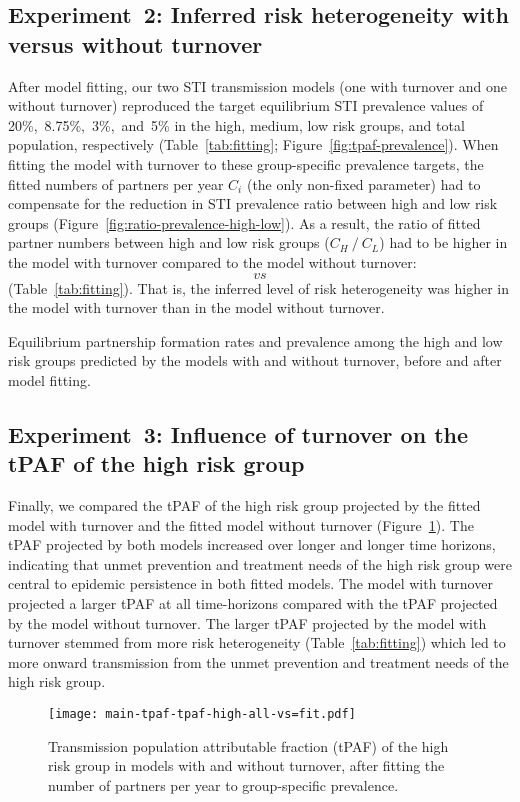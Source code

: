 \subsection{Experiment~2: Inferred risk heterogeneity with versus without turnover}
\label{ss:res-infer}
After model fitting,
our two STI transmission models
(one with turnover and one without turnover)
reproduced the target equilibrium STI prevalence values of 20\%,~8.75\%,~3\%,~and~5\%
in the high, medium, low risk groups, and total population, respectively
(Table~\ref{tab:fitting}; Figure~\ref{fig:tpaf-prevalence}).
When fitting the model with turnover to these group-specific prevalence targets,
the fitted numbers of partners per year $C_i$ (the only non-fixed parameter)
had to compensate for the reduction in
STI prevalence ratio between high and low risk groups
(Figure~\ref{fig:ratio-prevalence-high-low}).
As a result, the ratio of fitted partner numbers
between high and low risk groups ($C_H~/~C_L$)
had to be higher in the model with turnover compared to the model without turnover:
$$~vs~%
$$
(Table~\ref{tab:fitting}).
That is, the inferred level of risk heterogeneity was higher
in the model with turnover than in the model without turnover.
\begin{table}
  \caption{Equilibrium partnership formation rates and prevalence
    among the high and low risk groups
    predicted by the models with and without turnover,
    before and after model fitting.}
  \label{tab:fitting}
  
\end{table}
\subsection{Experiment~3: Influence of turnover on the tPAF of the high risk group}
\label{ss:res-tpaf}
Finally, we compared the tPAF of the high risk group
projected by the fitted model with turnover and the fitted model without turnover
(Figure~\ref{fig:tpaf-fit}).
The tPAF projected by both models
increased over longer and longer time horizons,
indicating that unmet prevention and treatment needs of the high risk group
were central to epidemic persistence in both fitted models.
The model with turnover projected a larger tPAF at all
time-horizons compared with the tPAF projected by the model without turnover.
The larger tPAF projected by the model with turnover
stemmed from more risk heterogeneity (Table~\ref{tab:fitting})
which led to more onward transmission from the unmet
prevention and treatment needs of the high risk group.
\begin{figure}[!tbp]
  \centerline{\texttt{[image: main-tpaf-tpaf-high-all-vs=fit.pdf]}}
  \caption{Transmission population attributable fraction (tPAF)
    of the high risk group in models with and without turnover,
    after fitting the number of partners per year to group-specific prevalence.}
  \label{fig:tpaf-fit}
\end{figure}